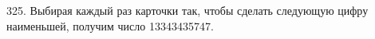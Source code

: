 325. Выбирая каждый раз карточки так, чтобы сделать следующую цифру наименьшей, получим число 13343435747.\\

